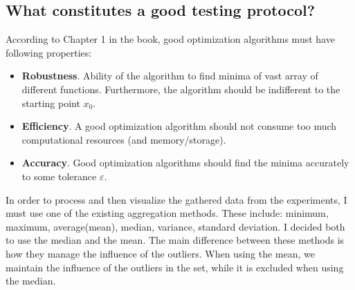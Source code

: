 \documentclass[a4paper]{article}
\begin{document}
\subsection{What constitutes a good testing protocol?}
According to Chapter 1 in the book, good optimization algorithms must have
following properties:
\begin{itemize}
\item \textbf{Robustness}. Ability of the algorithm to find minima of vast array
  of different functions. Furthermore, the algorithm should be indifferent to
  the starting point $x_0$.
\item \textbf{Efficiency}. A good optimization algorithm should not consume too
  much computational resources (and memory/storage).
\item \textbf{Accuracy}. Good optimization algorithms should find the minima
  accurately to some tolerance $\varepsilon$.
\end{itemize}
In order to process and then visualize the gathered data from the experiments, I
must use one of the existing aggregation methods. These include: minimum, maximum,
average(mean), median, variance, standard deviation. I decided both to use the
median and the mean. The main difference between these methods is how they
manage the influence of the outliers. When using the mean, we maintain the
influence of the outliers in the set, while it is excluded when using the median.
\end{document}
